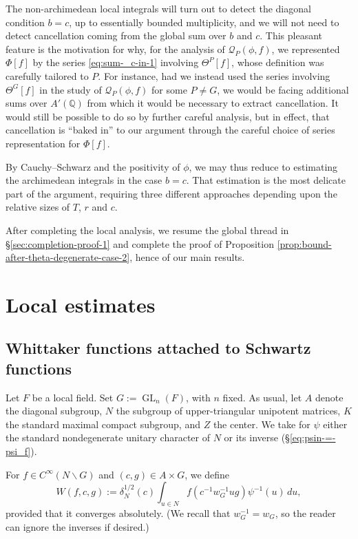 \documentclass[reqno]{amsart}
\DeclareMathOperator{\GL}{GL}
\theoremstyle{plain} \newtheorem{theorem} {Theorem}
\theoremstyle{definition} \newtheorem{definition} [theorem] {Definition}
\theoremstyle{itplain} %
\numberwithin{equation}{section}
\numberwithin{theorem}{section}
\begin{document}
The non-archimedean local integrals will turn out to detect the diagonal condition $b = c$, up to essentially bounded multiplicity, and we will not need to detect cancellation coming from the global sum over $b$ and $c$.  This pleasant feature is the motivation for why, for the analysis of $\mathcal{Q}_P(\phi, f)$, we represented $\Phi[f]$ by the series \eqref{eq:sum-_c-in-1} involving $\Theta^P[f]$, whose definition was carefully tailored to $P$.  For instance, had we instead used the series involving $\Theta^G[f]$ in the study of $\mathcal{Q}_P(\phi,f)$ for some $P \neq G$, we would be facing additional sums over $A'(\mathbb{Q})$ from which it would be necessary to extract cancellation.  It would still be possible to do so by further careful analysis, but in effect, that cancellation is ``baked in'' to our argument through the careful choice of series representation for $\Phi[f]$.

By Cauchy--Schwarz and the positivity of $\phi$, we may thus reduce to estimating the archimedean integrals in the case $b=c$.  That estimation is the most delicate part of the argument, requiring three different approaches depending upon the relative sizes of $T$, $r$ and $c$.

After completing the local analysis, we resume the global thread in \S\ref{sec:completion-proof-1} and complete the proof of Proposition \ref{prop:bound-after-theta-degenerate-case-2}, hence of our main results.


\section{Local estimates}\label{sec:local-estimates}

\subsection{Whittaker functions attached to Schwartz functions}\label{sec:whitt-funct-attach}

Let $F$ be a local field.  Set $G := \GL_n(F)$, with $n$ fixed.  As usual, let $A$ denote the diagonal subgroup, $N$ the subgroup of upper-triangular unipotent matrices, $K$ the standard maximal compact subgroup, and $Z$ the center.  We take for $\psi$ either the standard nondegenerate unitary character of $N$ or its inverse (\S\ref{eq:psin-=-psi_f}).

For $f \in C^\infty(N \backslash G)$ and $(c,g) \in A \times G$, we define
\begin{equation*}
  W(f,c,g) := \delta_N^{1/2}(c) \int _{u \in N} f(c^{-1} w^{-1}_G u g) \psi^{-1}(u) \, d u,
\end{equation*}
provided that it converges absolutely.  (We recall that $w_G^{-1} = w_G$, so the reader can ignore the inverses if desired.)
\end{document}
